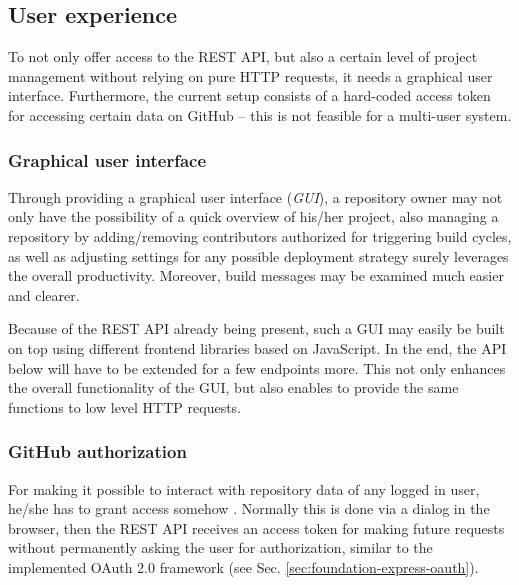 \subsection{User experience}
\label{sec:outlook-userexperience}

To not only offer access to the REST API, but also a certain level of project management without relying on pure HTTP requests, it needs a graphical user interface. Furthermore, the current setup consists of a hard-coded access token for accessing certain data on GitHub -- this is not feasible for a multi-user system.

\subsubsection{Graphical user interface}
Through providing a graphical user interface (\emph{GUI}), a repository owner may not only have the possibility of a quick overview of his/her project, also managing a repository by adding/removing contributors authorized for triggering build cycles, as well as adjusting settings for any possible deployment strategy surely leverages the overall productivity. Moreover, build messages may be examined much easier and clearer.

Because of the REST API already being present, such a GUI may easily be built on top using different frontend libraries based on JavaScript. In the end, the API below will have to be extended for a few endpoints more. This not only enhances the overall functionality of the GUI, but also enables to provide the same functions to low level HTTP requests.

\subsubsection{GitHub authorization}
For making it possible to interact with repository data of any logged in user, he/she has to grant access somehow \cite{GithubAuthentication}. Normally this is done via a dialog in the browser, then the REST API receives an access token for making future requests without permanently asking the user for authorization, similar to the implemented OAuth 2.0 framework (see Sec. \ref{sec:foundation-express-oauth}).
